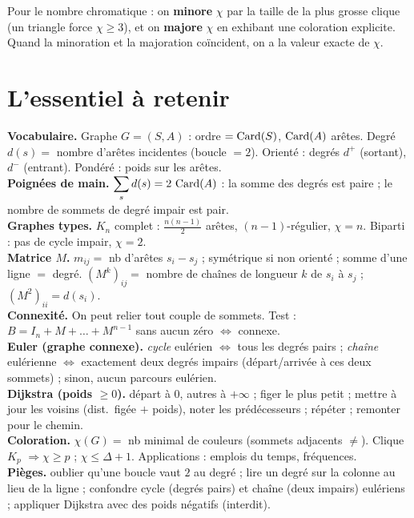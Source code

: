 \begin{aretenir}
Pour le nombre chromatique : on \textbf{minore} $\chi$ par la taille de la plus grosse clique
(un triangle force $\chi\ge3$), et on \textbf{majore} $\chi$ en exhibant une coloration
explicite. Quand la minoration et la majoration coïncident, on a la valeur exacte de $\chi$.
\end{aretenir}

\section{L'essentiel à retenir}

\begin{synthese}
\textbf{Vocabulaire.} Graphe $G=(S,A)$ : ordre $=\operatorname{Card}(S)$, $\operatorname{Card}(A)$ arêtes. Degré
$d(s)=$ nombre d'arêtes incidentes (boucle $=2$). Orienté : degrés $d^{+}$ (sortant),
$d^{-}$ (entrant). Pondéré : poids sur les arêtes.\\[4pt]
\textbf{Poignées de main.} $\displaystyle\sum_s d(s)=2\,\operatorname{Card}(A)$ : la somme des degrés est
paire ; le nombre de sommets de degré impair est pair.\\[4pt]
\textbf{Graphes types.} $K_n$ complet : $\tfrac{n(n-1)}2$ arêtes, $(n-1)$-régulier,
$\chi=n$. Biparti : pas de cycle impair, $\chi=2$.\\[4pt]
\textbf{Matrice $M$.} $m_{ij}=$ nb d'arêtes $s_i\!-\!s_j$ ; symétrique si non orienté ; somme
d'une ligne $=$ degré. $(M^k)_{ij}=$ nombre de chaînes de longueur $k$ de $s_i$ à $s_j$ ;
$(M^2)_{ii}=d(s_i)$.\\[4pt]
\textbf{Connexité.} On peut relier tout couple de sommets. Test : $B=I_n+M+\dots+M^{n-1}$ sans
aucun zéro $\iff$ connexe.\\[4pt]
\textbf{Euler (graphe connexe).} \emph{cycle} eulérien $\iff$ tous les degrés pairs ;
\emph{chaîne} eulérienne $\iff$ exactement deux degrés impairs (départ/arrivée à ces deux
sommets) ; sinon, aucun parcours eulérien.\\[4pt]
\textbf{Dijkstra (poids $\ge0$).} départ à $0$, autres à $+\infty$ ; figer le plus petit ;
mettre à jour les voisins (dist.\ figée $+$ poids), noter les prédécesseurs ; répéter ;
remonter pour le chemin.\\[4pt]
\textbf{Coloration.} $\chi(G)=$ nb minimal de couleurs (sommets adjacents $\ne$). Clique $K_p$
$\Rightarrow\chi\ge p$ ; $\chi\le\Delta+1$. Applications : emplois du temps, fréquences.\\[4pt]
\textbf{Pièges.} oublier qu'une boucle vaut $2$ au degré ; lire un degré sur la colonne au lieu
de la ligne ; confondre cycle (degrés pairs) et chaîne (deux impairs) eulériens ; appliquer
Dijkstra avec des poids négatifs (interdit).
\end{synthese}

